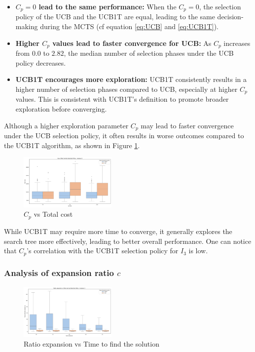 \documentclass[conference]{IEEEtran}
\begin{document}
\begin{itemize}
    \item \textbf{\( C_p = 0 \) lead to the same performance:}
          When the $C_p=0$, the selection policy of the UCB and the UCB1T are equal, leading to the same decision-making during the MCTS (cf equation \ref{eq:UCB} and \ref{eq:UCB1T}).
    \item \textbf{Higher \( C_p \) values lead to faster convergence for UCB:}
          As \( C_p \) increases from $0.0$ to $2.82$, the median number of selection phases under the UCB policy decreases.

    \item \textbf{UCB1T encourages more exploration:}
          UCB1T consistently results in a higher number of selection phases compared to UCB, especially at higher \( C_p \) values. This is consistent with UCB1T's definition to promote broader exploration before converging.
\end{itemize}

Although a higher exploration parameter $C_p$ may lead to faster convergence under the UCB selection policy, it often results in worse outcomes compared to the UCB1T algorithm, as shown in Figure \ref{fig:cp_vs_cost_3}.
\begin{figure}[!ht]
    \centering
    \includegraphics[width=0.42\textwidth]{Figures/3 - cp_vs_cost.png}
    \caption{$C_p$ vs Total cost}
    \label{fig:cp_vs_cost_3}
\end{figure}
While UCB1T may require more time to converge, it generally explores the search tree more effectively, leading to better overall performance. One can notice that $C_p$'s correlation with the UCB1T selection policy for $I_3$ is low.


\subsubsection*{Analysis of expansion ratio $c$}

\begin{figure}[!ht]
    \centering
    \includegraphics[width=0.42\textwidth]{Figures/3 - ratio_vs_time.png}
    \caption{Ratio expansion vs Time to find the solution}
    \label{fig:Ratio vs Time}
\end{figure}
\end{document}
